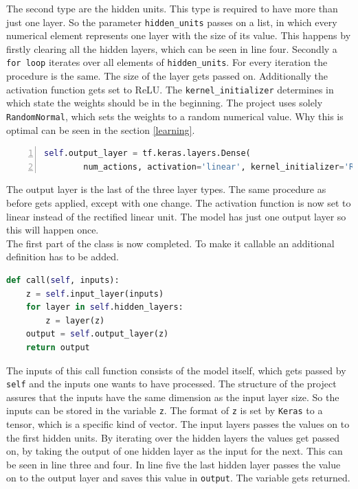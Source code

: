 \documentclass[12pt]{article}
\begin{document}
The second type are the hidden units. This type is required to have more than just one layer. So the parameter \lstinline{hidden_units} passes on a list, in which every numerical element represents one layer with the size of its value. This happens by firstly clearing all the hidden layers, which can be seen in line four. Secondly a \lstinline{for loop} iterates over all elements of \lstinline{hidden_units}. For every iteration the procedure is the same. The size of the layer gets passed on. Additionally the activation function gets set to ReLU. The \lstinline{kernel_initializer} determines in which state the weights should be in the beginning. The project uses solely \lstinline{RandomNormal}, which sets the weights to a random numerical value. Why this is optimal can be seen in the section \ref{learning}.
\lstset{ numbers=left, stepnumber=1,      firstnumber=8,  numberfirstline=true}
\begin{lstlisting}[language=Python,numbers=left]
    self.output_layer = tf.keras.layers.Dense(
        num_actions, activation='linear', kernel_initializer='RandomNormal')
\end{lstlisting}
The output layer is the last of the three layer types. The same procedure as before gets applied, except with one change. The activation function is now set to linear instead of the rectified linear unit. The model has just one output layer so this will happen once.
\lstset{ numbers=left, stepnumber=1,firstnumber=1,  numberfirstline=true}
\\ The first part of the class is now completed. To make it callable an additional definition has to be added.
\begin{lstlisting}[language=Python, caption = Example - Making the model callable]
def call(self, inputs):
    z = self.input_layer(inputs) 
    for layer in self.hidden_layers: 
        z = layer(z) 
    output = self.output_layer(z) 
    return output
\end{lstlisting}
The inputs of this call function consists of the model itself, which gets passed by \lstinline{self} and the inputs one wants to have processed. The structure of the project assures that the inputs have the same dimension as the input layer size. So the inputs can be stored in the variable \lstinline{z}. The format of \lstinline{z} is set by \lstinline{Keras} to a tensor, which is a specific kind of vector. The input layers passes the values on to the first hidden units. By iterating over the hidden layers the values get passed on, by taking the output of one hidden layer as the input for the next. This can be seen in line three and four. In line five the last hidden layer passes the value on to the output layer and saves this value in \lstinline{output}. The variable gets returned.
\end{document}
